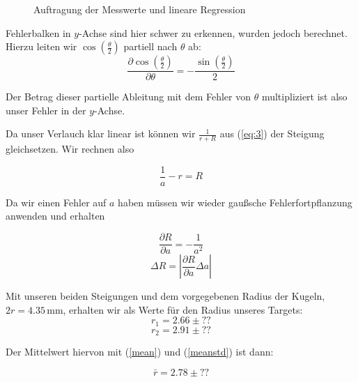 \documentclass[11pt,a4paper]{article}
\begin{document}
\begin{figure}[p]
\centering
{}
\renewcommand\thefigure{1}
\caption{Auftragung der Messwerte und lineare Regression}
\label{Abb:1}
\end{figure}

Fehlerbalken in $y$-Achse sind hier schwer zu erkennen, wurden jedoch berechnet. Hierzu leiten wir $\cos\left(\frac{\theta}{2}\right)$ partiell nach $\theta$ ab:
\[
\frac{\partial\cos\left(\frac{\theta}{2}\right)}{\partial\theta}=-\frac{\sin\left(\frac{\theta}{2}\right)}{2}
\]

Der Betrag dieser partielle Ableitung mit dem Fehler von $\theta$ multipliziert ist also unser Fehler in der $y$-Achse.

Da unser Verlauch klar linear ist k\"onnen wir $\frac{1}{r+R}$ aus (\ref{eq:3}) der Steigung gleichsetzen. Wir rechnen also

\begin{equation}
\frac{1}{a}-r=R\label{eq:5}
\end{equation}

Da wir einen Fehler auf $a$ haben m\"ussen wir wieder gau\ss sche Fehlerfortpflanzung anwenden und erhalten

\[
\frac{\partial R}{\partial a}=-\frac{1}{a^2}
\]
\[
\Delta R=\left|\frac{\partial R}{\partial a}\Delta a\right|
\]

Mit unseren beiden Steigungen und dem vorgegebenen Radius der Kugeln, $2r=4.35\,\mathrm{mm}$, erhalten wir als Werte f\"ur den Radius unseres Targets:
\[r_1=2.66\pm??\]
\[r_2=2.91\pm??\]

Der Mittelwert hiervon mit (\ref{mean}) und (\ref{meanstd}) ist dann:

\[\bar{r}=2.78\pm??\]
\end{document}
